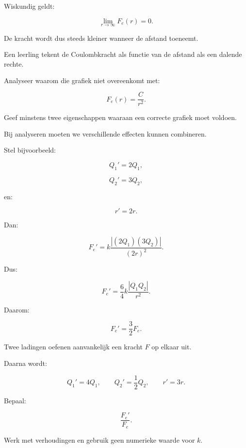 \documentclass{ximera}
\begin{document}
Wiskundig geldt:

\[
\lim_{r\rightarrow\infty}F_e(r)=0.
\]

De kracht wordt dus steeds kleiner wanneer de afstand toeneemt.


\begin{oefening}{\oefU\ESS}

Een leerling tekent de Coulombkracht als functie van de afstand als
een dalende rechte.

Analyseer waarom die grafiek niet overeenkomt met:

\[
F_e(r)=\frac{C}{r^2}.
\]

Geef minstens twee eigenschappen waaraan een correcte grafiek moet
voldoen.

\end{oefening}




Bij analyseren moeten we verschillende effecten kunnen combineren.

Stel bijvoorbeeld:

\[
Q_1'=2Q_1,
\]

\[
Q_2'=3Q_2,
\]

en:

\[
r'=2r.
\]

Dan:

\[
F_e'
=
k\frac{|(2Q_1)(3Q_2)|}{(2r)^2}.
\]

Dus:

\[
F_e'
=
\frac{6}{4}
k\frac{|Q_1Q_2|}{r^2}.
\]

Daarom:

\[
\boxed{
F_e'=\frac32F_e.
}
\]


\begin{oefening}{\oefU\ESS}

Twee ladingen oefenen aanvankelijk een kracht $F$ op elkaar uit.

Daarna wordt:

\[
Q_1'=4Q_1,
\qquad
Q_2'=\frac12Q_2,
\qquad
r'=3r.
\]

Bepaal:

\[
\frac{F_e'}{F_e}.
\]

Werk met verhoudingen en gebruik geen numerieke waarde voor $k$.

\end{oefening}
\end{document}
